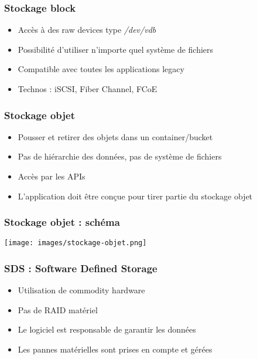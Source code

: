   \begin{frame}
    \frametitle{Stockage block}
    \begin{itemize}
      \item Accès à des raw devices type \textit{/dev/vdb}
      \item Possibilité d'utiliser n'importe quel système de fichiers
      \item Compatible avec toutes les applications legacy
      \item Technos : iSCSI, Fiber Channel, FCoE
    \end{itemize}
  \end{frame}

  \begin{frame}
    \frametitle{Stockage objet}
    \begin{itemize}
      \item Pousser et retirer des objets dans un container/bucket
      \item Pas de hiérarchie des données, pas de système de fichiers
      \item Accès par les APIs
      \item L'application doit être conçue pour tirer partie du stockage objet
    \end{itemize}
  \end{frame}

  \begin{frame}
    \frametitle{Stockage objet : schéma}
    \begin{center}
      \texttt{[image: images/stockage-objet.png]}
    \end{center}
  \end{frame}

  \begin{frame}
    \frametitle{SDS : Software Defined Storage}
    \begin{itemize}
      \item Utilisation de commodity hardware
      \item Pas de RAID matériel
      \item Le logiciel est responsable de garantir les données
      \item Les pannes matérielles sont prises en compte et gérées
    \end{itemize}
  \end{frame}

